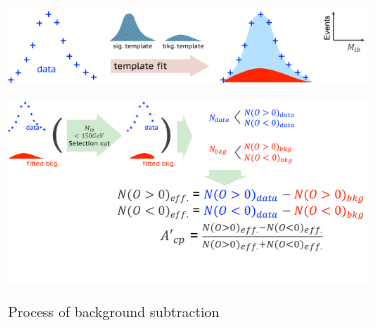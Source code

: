 		\begin{figure}[H]
		\centering{}
	    	\includegraphics[width=0.85\textwidth]{Figures/BackgroundEstimation/bkg_sub_1.pdf}\\
		\end{figure}
		\FloatBarrier
		\begin{figure}[H]
		\centering{}
	    	\includegraphics[width=0.85\textwidth]{Figures/BackgroundEstimation/bkg_sub_2.pdf}\\
		\caption{Process of background subtraction}
		\label{BkgEst:fig:Bkt_sub}
		\end{figure}
		\FloatBarrier


\FloatBarrier
